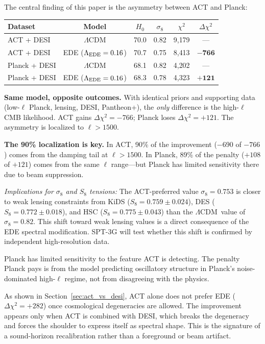 \documentclass[twocolumn,showpacs,preprintnumbers,amsmath,amssymb,prd]{revtex4-2}
\newcommand{\lcdm}{$\Lambda$CDM}
\begin{document}
The central finding of this paper is the asymmetry between ACT and Planck:
\begin{center}
\begin{tabular}{lccccc}
\toprule
Dataset & Model & $H_0$ & $\sigma_8$ & $\chi^2$ & $\Delta\chi^2$ \\
\midrule
ACT + DESI & \lcdm & 70.0 & 0.82 & 9{,}179 & --- \\
ACT + DESI & EDE ($\Lambda_{\rm EDE} = 0.16$) & 70.7 & 0.75 & 8{,}413 & $\mathbf{-766}$ \\
\midrule
Planck + DESI & \lcdm & 68.1 & 0.82 & 4{,}202 & --- \\
Planck + DESI & EDE ($\Lambda_{\rm EDE} = 0.16$) & 68.3 & 0.78 & 4{,}323 & $\mathbf{+121}$ \\
\bottomrule
\end{tabular}
\end{center}

\textbf{Same model, opposite outcomes.} With identical priors and supporting 
data (low-$\ell$ Planck, lensing, DESI, Pantheon+), the \emph{only} difference 
is the high-$\ell$ CMB likelihood. ACT gains $\Delta\chi^2 = -766$; Planck 
loses $\Delta\chi^2 = +121$. The asymmetry is localized to $\ell > 1500$.

\textbf{The 90\% localization is key.} In ACT, 90\% of the improvement ($-690$ 
of $-766$) comes from the damping tail at $\ell > 1500$. In Planck, 89\% of 
the penalty ($+108$ of $+121$) comes from the same $\ell$ range---but Planck 
has limited sensitivity there due to beam suppression.

\emph{Implications for $\sigma_8$ and $S_8$ tensions:} The ACT-preferred 
value $\sigma_8 = 0.753$ is closer to weak lensing constraints from 
KiDS ($S_8 = 0.759 \pm 0.024$), DES ($S_8 = 0.772 \pm 0.018$), and HSC 
($S_8 = 0.775 \pm 0.043$) than the \lcdm\ value of $\sigma_8 = 0.82$. 
This shift toward weak lensing values is a direct consequence of the 
EDE spectral modification. SPT-3G will test whether this shift is 
confirmed by independent high-resolution data.

Planck has limited sensitivity to the feature ACT is detecting. The penalty 
Planck pays is from the model predicting oscillatory structure in Planck's 
noise-dominated high-$\ell$ regime, not from disagreeing with the physics.

As shown in Section~\ref{sec:act_vs_desi}, ACT alone does not prefer EDE 
($\Delta\chi^2 = +282$) once cosmological degeneracies are allowed. The 
improvement appears only when ACT is combined with DESI, which breaks the 
degeneracy and forces the shoulder to express itself as spectral shape. 
This is the signature of a sound-horizon recalibration rather than a 
foreground or beam artifact.
\end{document}
